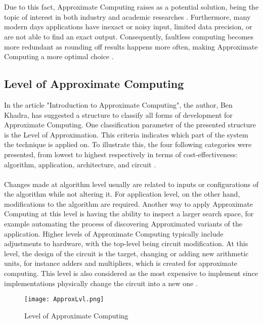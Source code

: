 ~\\
~\\
Due to this fact, Approximate Computing raises as a potential solution, being the topic of interest in both industry and academic researches \cite{7348659}. Furthermore, many modern days applications have inexact or noisy input, limited data precision, or are not able to find an exact output. Consequently, faultless computing becomes more redundant as rounding off results happens more often, making Approximate Computing a more optimal choice \cite{AxCSurvey}. \\

\subsection{Level of Approximate Computing}

In the article "Introduction to Approximate Computing", the author, Ben Khadra, has suggested a structure to classify all forms of development for Approximate Computing. One classification parameter of the presented structure is the Level of Approximation. This criteria indicates which part of the system the technique is applied on. To illustrate this, the four following categories were presented, from lowest to highest respectively in terms of cost-effectiveness: algorithm, application, architecture, and circuit \cite{introAxC}. \\
~\\
Changes made at algorithm level usually are related to inputs or configurations of the algorithm while not altering it. For application level, on the other hand, modifications to the algorithm are required. Another way to apply Approximate Computing at this level is having the ability to inspect a larger search space, for example automating the process of discovering Approximated variants of the application. Higher levels of Approximate Computing typically include adjustments to hardware, with the top-level being circuit modification. At this level, the design of the circuit is the target, changing or adding new arithmetic units, for instance adders and multipliers, which is created for approximate computing. This level is also considered as the most expensive to implement since implementations physically change the circuit into a new one \cite{introAxC}.
\newpage
\begin{figure}[H]
\texttt{[image: ApproxLvl.png]}
\centering
\caption{Level of Approximate Computing}
\end{figure}

